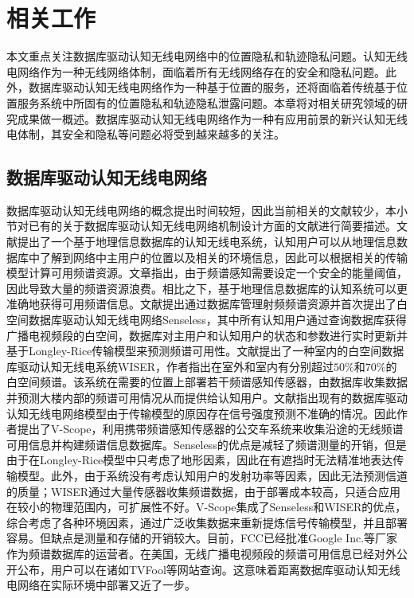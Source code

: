 
\chapter{相关工作}\label{chap:related_work}

本文重点关注数据库驱动认知无线电网络中的位置隐私和轨迹隐私问题。认知无线电网络作为一种无线网络体制，面临着所有无线网络存在的安全和隐私问题。此外，数据库驱动认知无线电网络作为一种基于位置的服务，还将面临着传统基于位置服务系统中所固有的位置隐私和轨迹隐私泄露问题。本章将对相关研究领域的研究成果做一概述。数据库驱动认知无线电网络作为一种有应用前景的新兴认知无线电体制，其安全和隐私等问题必将受到越来越多的关注。

\section{数据库驱动认知无线电网络}\label{sec:database-driven}

数据库驱动认知无线电网络的概念提出时间较短，因此当前相关的文献较少，本小节对已有的关于数据库驱动认知无线电网络机制设计方面的文献进行简要描述。文献\cite{gurney2008geo}提出了一个基于地理信息数据库的认知无线电系统，认知用户可以从地理信息数据库中了解到网络中主用户的位置以及相关的环境信息，因此可以根据相关的传输模型计算可用频谱资源。文章指出，由于频谱感知需要设定一个安全的能量阈值，因此导致大量的频谱资源浪费。相比之下，基于地理信息数据库的认知系统可以更准确地获得可用频谱信息。文献\cite{murty2012senseless}提出通过数据库管理射频频谱资源并首次提出了白空间数据库驱动认知无线电网络Senseless，其中所有认知用户通过查询数据库获得广播电视频段的白空间，数据库对主用户和认知用户的状态和参数进行实时更新并基于Longley-Rice传输模型来预测频谱可用性。文献\cite{ying2013exploring}提出了一种室内的白空间数据库驱动认知无线电系统WISER，作者指出在室外和室内有分别超过$50\%$和$70\%$的白空间频谱。该系统在需要的位置上部署若干频谱感知传感器，由数据库收集数据并预测大楼内部的频谱可用情况从而提供给认知用户。文献\cite{zhangvehicle}指出现有的数据库驱动认知无线电网络模型由于传输模型的原因存在信号强度预测不准确的情况。因此作者提出了V-Scope，利用携带频谱感知传感器的公交车系统来收集沿途的无线频谱可用信息并构建频谱信息数据库。Senseless的优点是减轻了频谱测量的开销，但是由于在Longley-Rice模型中只考虑了地形因素，因此在有遮挡时无法精准地表达传输模型。此外，由于系统没有考虑认知用户的发射功率等因素，因此无法预测信道的质量；WISER通过大量传感器收集频谱数据，由于部署成本较高，只适合应用在较小的物理范围内，可扩展性不好。V-Scope集成了Senseless和WISER的优点，综合考虑了各种环境因素，通过广泛收集数据来重新提炼信号传输模型，并且部署容易。但缺点是测量和存储的开销较大。目前，FCC已经批准Google Inc.等厂家作为频谱数据库的运营者。在美国，无线广播电视频段的频谱可用信息已经对外公开公布，用户可以在诸如TVFool等网站查询。这意味着距离数据库驱动认知无线电网络在实际环境中部署又近了一步。

